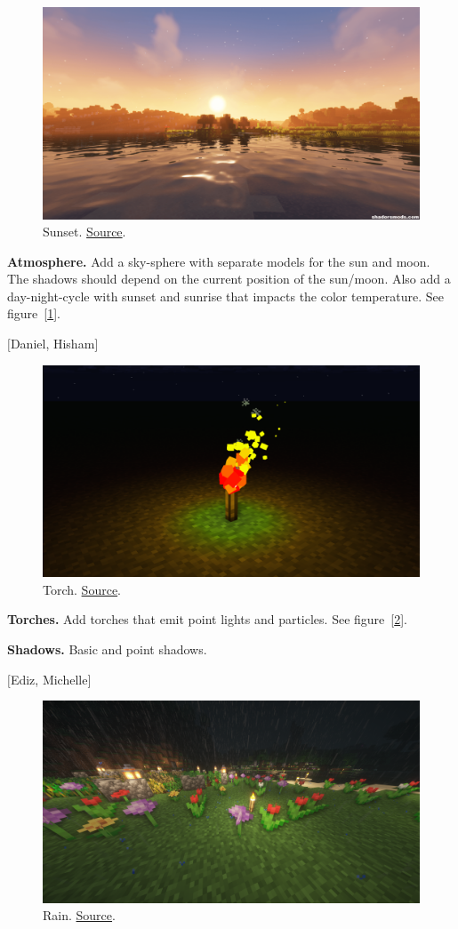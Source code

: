 \documentclass[A4paper]{gdv/gdv}
\newcommand{\teilaufgabe}[1]{\textbf{#1.}}
\begin{document}
\begin{gdvSheet}
\begin{figure}[ht]
	\centering
	\includegraphics[width=.4\textwidth]{img/sunset}
	\caption{Sunset. \href{https://shadersmods.com/complementary-shaders/}{Source}.}\label{fig:sun}
\end{figure}

\teilaufgabe{Atmosphere}
Add a sky-sphere with separate models for the sun and moon.
The shadows should depend on the current position of the sun/moon.
Also add a day-night-cycle with sunset and sunrise that impacts the color temperature.
See figure~[\ref{fig:sun}].

$[$Daniel, Hisham$]$

\begin{figure}[ht]
	\centering
	\includegraphics[width=.4\textwidth]{img/torch}
	\caption{Torch. \href{https://www.mineimatorforums.com/index.php?/topic/62414-advanced-torch-rig/}{Source}.}\label{fig:torch}
\end{figure}

\teilaufgabe{Torches}
Add torches that emit point lights and particles.
See figure~[\ref{fig:torch}].

\teilaufgabe{Shadows}
Basic and point shadows.

$[$Ediz, Michelle$]$

\begin{figure}[ht]
	\centering
	\includegraphics[width=.4\textwidth]{img/rain}
	\caption{Rain. \href{https://www.reddit.com/r/Optifine/comments/kiifzm/bsl_shaders_rain_reflection_not_working/}{Source}.}\label{fig:rain}
\end{figure}


\end{gdvSheet}
\end{document}
